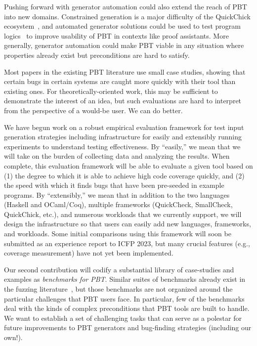 Pushing forward with generator automation could also extend the reach of PBT
into new domains. Constrained generation is a major difficulty of the
QuickChick ecosystem~\cite{paraskevopoulou_foundational_2015}, and automated
generator solutions could be used to test program
logics~\cite{jung_iris_2018,leino_dafny_2010} to improve usability of PBT in
contexts like proof assistants. More generally, generator automation could make
PBT viable in any situation where properties already exist but preconditions
are hard to satisfy.


Most papers in the existing PBT literature use small case studies,
showing that certain bugs in certain systems
are caught more quickly with their tool than existing ones. For
theoretically-oriented work, this may be sufficient
to demonstrate the interest of an idea, but such evaluations
are hard to interpret from the perspective of a would-be user.
We can do better.

We have begun work on a robust empirical evaluation framework for
test input generation strategies
including infrastructure
for easily and extensibly running experiments to understand testing
effectiveness.  By ``easily,'' we mean that we will take on the burden of
collecting data and analyzing the results.  When complete, this
evaluation framework will be able to evaluate a given tool based on (1) the
degree to which it is able to achieve high code coverage quickly, and (2) the
speed with which it finds bugs that have been pre-seeded in example programs. By
``extensibly,'' we mean that in addition to the two languages (Haskell and
OCaml/Coq), multiple frameworks (QuickCheck, SmallCheck, QuickChick, etc.), and
numerous workloads that we currently support, we will design the
infrastructure so that users can easily add new
languages, frameworks, and workloads.
Some initial comparisons using this framework will soon be submitted as an experience
report to ICFP 2023, but many crucial features (e.g., coverage measurement) have not yet
been implemented.

Our second contribution will codify a substantial library of case-studies and examples as
{\em benchmarks for PBT}. Similar suites of benchmarks already exist in the
fuzzing literature~\cite{hazimeh_magma_2021}, but those benchmarks are not
organized around the particular challenges that PBT users face. In particular,
few of the benchmarks deal with the kinds of complex preconditions that PBT
tools are built to handle. We want to establish a set of challenging tasks that
can serve as a polestar for future improvements to PBT generators and
bug-finding strategies (including our own!).

